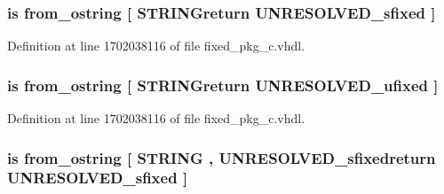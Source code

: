 \subsubsection[{from\+\_\+octal\+\_\+string}]{ {\bfseries \textcolor{keywordflow}{is}\textcolor{vhdlchar}{ }\textcolor{vhdlchar}{from\+\_\+ostring}\textcolor{vhdlchar}{ }\textcolor{vhdlchar}{\mbox{[}}\textcolor{vhdlchar}{ }\textcolor{vhdlchar}{S\+T\+R\+I\+N\+Greturn}\textcolor{vhdlchar}{ }{\bfseries {\bf U\+N\+R\+E\+S\+O\+L\+V\+E\+D\+\_\+sfixed}} \textcolor{vhdlchar}{ }\textcolor{vhdlchar}{\mbox{]}}\textcolor{vhdlchar}{ }} \hspace{0.3cm}{\ttfamily [Alias]}}\label{classfixed__pkg_ad03780406d82a1039546103c01b05ab0}


Definition at line 1702038116 of file fixed\+\_\+pkg\+\_\+c.\+vhdl.

\hypertarget{classfixed__pkg_a2b0895c85462ecb81aa58edb01967ec6}{}
\subsubsection[{from\+\_\+octal\+\_\+string}]{ {\bfseries \textcolor{keywordflow}{is}\textcolor{vhdlchar}{ }\textcolor{vhdlchar}{from\+\_\+ostring}\textcolor{vhdlchar}{ }\textcolor{vhdlchar}{\mbox{[}}\textcolor{vhdlchar}{ }\textcolor{vhdlchar}{S\+T\+R\+I\+N\+Greturn}\textcolor{vhdlchar}{ }{\bfseries {\bf U\+N\+R\+E\+S\+O\+L\+V\+E\+D\+\_\+ufixed}} \textcolor{vhdlchar}{ }\textcolor{vhdlchar}{\mbox{]}}\textcolor{vhdlchar}{ }} \hspace{0.3cm}{\ttfamily [Alias]}}\label{classfixed__pkg_a2b0895c85462ecb81aa58edb01967ec6}


Definition at line 1702038116 of file fixed\+\_\+pkg\+\_\+c.\+vhdl.

\hypertarget{classfixed__pkg_a2b916b59ea97f4c9f2ede4a0fec2c7fc}{}
\subsubsection[{from\+\_\+octal\+\_\+string}]{ {\bfseries \textcolor{keywordflow}{is}\textcolor{vhdlchar}{ }\textcolor{vhdlchar}{from\+\_\+ostring}\textcolor{vhdlchar}{ }\textcolor{vhdlchar}{\mbox{[}}\textcolor{vhdlchar}{ }\textcolor{comment}{S\+T\+R\+I\+N\+G}\textcolor{vhdlchar}{ }\textcolor{vhdlchar}{,}\textcolor{vhdlchar}{ }\textcolor{vhdlchar}{U\+N\+R\+E\+S\+O\+L\+V\+E\+D\+\_\+sfixedreturn}\textcolor{vhdlchar}{ }{\bfseries {\bf U\+N\+R\+E\+S\+O\+L\+V\+E\+D\+\_\+sfixed}} \textcolor{vhdlchar}{ }\textcolor{vhdlchar}{\mbox{]}}\textcolor{vhdlchar}{ }} \hspace{0.3cm}{\ttfamily [Alias]}}\label{classfixed__pkg_a2b916b59ea97f4c9f2ede4a0fec2c7fc}


